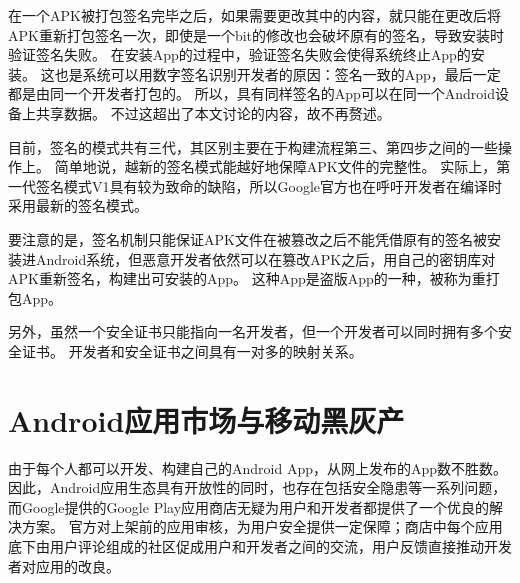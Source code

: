 %

在一个APK被打包签名完毕之后，如果需要更改其中的内容，就只能在更改后将APK重新打包签名一次，即使是一个bit的修改也会破坏原有的签名，导致安装时验证签名失败。
在安装App的过程中，验证签名失败会使得系统终止App的安装。
这也是系统可以用数字签名识别开发者的原因：签名一致的App，最后一定都是由同一个开发者打包的。
所以，具有同样签名的App可以在同一个Android设备上共享数据。
不过这超出了本文讨论的内容，故不再赘述。

目前，签名的模式共有三代，其区别主要在于构建流程第三、第四步之间的一些操作上。
简单地说，越新的签名模式能越好地保障APK文件的完整性。
实际上，第一代签名模式V1具有较为致命的缺陷，所以Google官方也在呼吁开发者在编译时采用最新的签名模式。

要注意的是，签名机制只能保证APK文件在被篡改之后不能凭借原有的签名被安装进Android系统，但恶意开发者依然可以在篡改APK之后，用自己的密钥库对APK重新签名，构建出可安装的App。
这种App是盗版App的一种，被称为重打包App。

另外，虽然一个安全证书只能指向一名开发者，但一个开发者可以同时拥有多个安全证书。
开发者和安全证书之间具有一对多的映射关系。

\section{Android应用市场与移动黑灰产}
\label{sec:androidMkt}

由于每个人都可以开发、构建自己的Android App，从网上发布的App数不胜数。
因此，Android应用生态具有开放性的同时，也存在包括安全隐患等一系列问题，而Google提供的Google Play应用商店无疑为用户和开发者都提供了一个优良的解决方案。
官方对上架前的应用审核，为用户安全提供一定保障；商店中每个应用底下由用户评论组成的社区促成用户和开发者之间的交流，用户反馈直接推动开发者对应用的改良。

